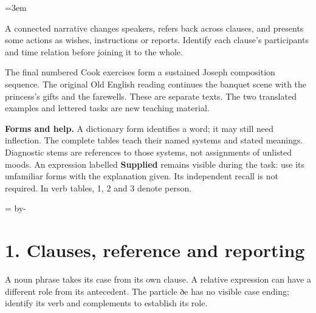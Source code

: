 \newcommand{\runningtitle}{Unit 18. Prose consolidation}

\emergencystretch=3em
\newcommand{\itempara}[2]{\par\addvspace{3pt}\noindent\hangindent=1.8em\hangafter=1\makebox[1.8em][l]{#1.}#2\par}
\newcommand{\reserve}[1]{\par\penalty-100\begingroup\dimen0=\pagegoal\advance\dimen0 by-\pagetotal\ifdim\dimen0<#1\newpage\fi\endgroup}

\raggedright
{}

A connected narrative changes speakers, refers back across clauses, and presents some actions as wishes, instructions or reports. Identify each clause’s participants and time relation before joining it to the whole.

The final numbered Cook exercises form a sustained Joseph composition sequence. The original Old English reading continues the banquet scene with the princess’s gifts and the farewells. These are separate texts. The two translated examples and lettered tasks are new teaching material.

\textbf{Forms and help.} A dictionary form identifies a word; it may still need inflection. The complete tables teach their named systems and stated meanings. Diagnostic stems are references to those systems, not assignments of unlisted moods. An expression labelled \textbf{Supplied} remains visible during the task: use its unfamiliar forms with the explanation given. Its independent recall is not required. In verb tables, 1, 2 and 3 denote person.

\reserve{7\baselineskip}
\section*{1. Clauses, reference and reporting}

A noun phrase takes its case from its own clause. A relative expression can have a different role from its antecedent. The particle ðe has no visible case ending; identify its verb and complements to establish its role.

